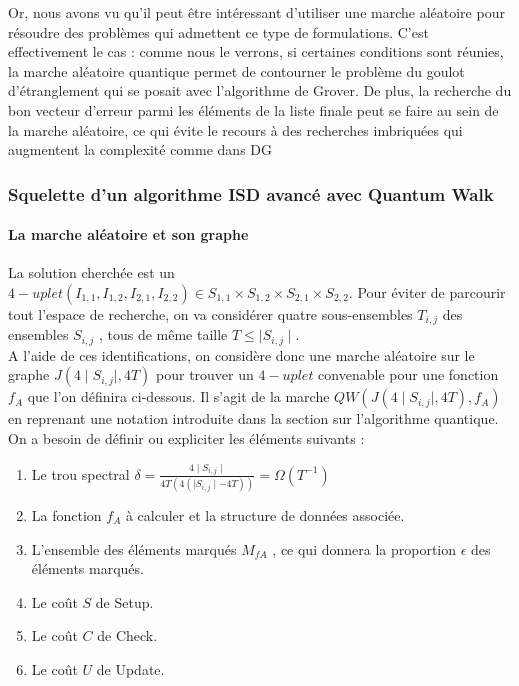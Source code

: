 \documentclass[12pt,openany]{report}
\begin{document}
Or, nous avons vu qu’il peut être intéressant d’utiliser une marche aléatoire
pour résoudre des problèmes qui admettent ce type de formulations. C’est
effectivement le cas : comme nous le verrons, si certaines conditions sont réunies,
la marche aléatoire quantique permet de contourner le problème du goulot
d’étranglement qui se posait avec l’algorithme de Grover. De plus, la recherche
du bon vecteur d’erreur parmi les éléments de la liste finale peut se faire au sein
de la marche aléatoire, ce qui évite le recours à des recherches imbriquées qui
augmentent la complexité comme dans DG
\subsubsection{Squelette d’un algorithme ISD avancé avec Quantum Walk}
\paragraph{La marche aléatoire et son graphe} \cite{Ghazal} La solution cherchée est un $4-uplet (I_{1,1},I_{1,2},I_{2,1},I_{2,2}) \in S_{1,1} \times S_{1,2} \times S_{2,1} \times S_{2,2}$. 
Pour éviter de parcourir tout
l’espace de recherche, on va considérer quatre sous-ensembles $ T_{i,j} $ des ensembles
$ S_{i,j} $ , tous de même taille $T \leq \mid S_{i,j} \mid $. \\
A l'aide de ces identifications, on considère donc une marche aléatoire sur le graphe $J(4\mid S_{i,j} \mid,4T)  $ pour trouver un $4-uplet$ convenable pour une fonction $ f_A$
que l'on définira ci-dessous. Il s'agit de la marche $  QW(J(4\mid S_{i,j} \mid,4T),f_A)  $ en reprenant une notation introduite dans la section sur l'algorithme quantique.\\
On a besoin de définir ou expliciter les éléments suivants :
\begin{enumerate}
\item Le trou spectral $ \delta=\frac{4\mid S_{i,j} \mid}{4T(4(\mid S_{i,j} \mid-4T))}=\Omega(T^{-1}) $
\item La fonction $f_A$ à calculer et la structure de données associée.
\item L’ensemble des éléments marqués $M_{fA}$ , ce qui donnera la proportion $\epsilon$
des éléments marqués.
\item Le coût $\mathit{S}$ de Setup.
\item Le coût $\mathit{C}$ de Check.
\item Le coût $\mathit{U}$ de Update.
\end{enumerate}
\end{document}
